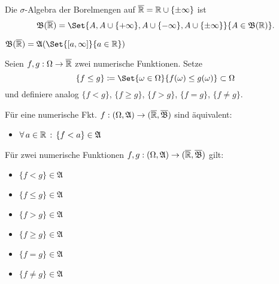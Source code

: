 \documentclass{cheat-sheet}
\newcommand{\Alg}{\mathfrak{A}} %
\newcommand{\Bor}{\mathfrak{B}} %
\theoremstyle{definition}
\begin{document}
\begin{defn}
  Die $\sigma$-Algebra der Borelmengen auf $\overline{\mathbb{R}} = \mathbb{R} \cup \{ \pm \infty \}$ ist
  \[ \Bor(\ER) = \Set{ A, A \cup \{ +\infty \}, A \cup \{ -\infty \}, A \cup \{ \pm \infty \} }{ A \in \Bor(\R) }. \]
\end{defn}

\begin{satz}
  $\Bor(\ER) = \Alg(\Set{ \cinterval{a}{\infty} }{ a \in \R })$
\end{satz}

\begin{nota}
  Seien $f, g : \Omega \to \overline{\mathbb{R}}$ zwei numerische Funktionen. Setze
    \[ \{ f \leq g \} \coloneqq \Set{ \omega \in \Omega }{ f(\omega) \leq g(\omega) } \subset \Omega \]
  und definiere analog $\{ f < g \}$, $\{ f \geq g \}$, $\{ f > g \}$, $\{ f = g \}$, $\{ f \not= g \}$.
\end{nota}


\begin{satz}
  Für eine numerische Fkt. $f : (\Omega, \Alg) \to (\ER, \overline{\Bor})$ sind äquivalent:
  \begin{itemize}
    \miniitem{0.7 \linewidth}{$\fa{a \in \R} \{ f \geq a \} = f^{-1}(\cinterval{a}{\infty}) \in \Alg$}
    \item $\fa{a \in \R} \{ f < a \} \in \Alg$
  \end{itemize}
\end{satz}

\begin{satz}
  Für zwei numerische Funktionen $f, g : (\Omega, \Alg) \to (\ER, \overline{\Bor})$ gilt:
  \begin{multicols}{3}
    \begin{itemize}
      \item $\{ f < g \} \in \Alg$
      \item $\{ f \leq g \} \in \Alg$
      \item $\{ f > g \} \in \Alg$
      \item $\{ f \geq g \} \in \Alg$
      \item $\{ f = g \} \in \Alg$
      \item $\{ f \not= g \} \in \Alg$
    \end{itemize}
  \end{multicols}
\end{satz}
\end{document}
